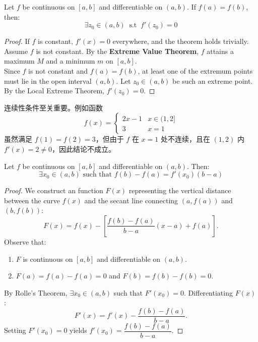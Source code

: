 \documentclass[
	UTF-8,
	11pt, %
	a4paper, %
]{LegrandOrangeBook}
\begin{document}
    \begin{lemma}
    Let $f$ be continuous on $[a, b]$ and differentiable on $(a, b)$. If $f(a) = f(b)$, then:
    \[ \exists z_0 \in (a, b)\ \text{ s.t }\ f'(z_0) = 0 \]
    \end{lemma}

    \begin{proof}
    If $f$ is constant, $f'(x) = 0$ everywhere, and the theorem holds trivially.\\

    Assume $f$ is not constant. By the \textbf{Extreme Value Theorem}, 
    $f$ attains a maximum $M$ and a minimum $m$ on $[a, b]$.\\

    Since $f$ is not constant and $f(a) = f(b)$, 
    at least one of the extremum points must lie in the open interval $(a, b)$.
    Let $z_0 \in (a, b)$ be such an extreme point. By the Local Extreme Theorem, $f'(z_0) = 0$.
    \end{proof}

    \begin{remark}
        连续性条件至关重要。例如函数
        \[ f(x) = \begin{cases} 2x - 1 & x \in (1, 2] \\ 3 & x = 1 \end{cases} \]
        虽然满足 $f(1)=f(2)=3$，但由于 $f$ 在 $x=1$ 处不连续，且在 $(1,2)$ 内 $f'(x)=2 \neq 0$，因此结论不成立。
    \end{remark}

    \begin{theorem}
    Let $f$ be continuous on $[a, b]$ and differentiable on $(a, b)$. Then:
    \[ \exists x_0 \in (a, b) \text{ such that } f(b) - f(a) = f'(x_0)(b - a) \]
    \end{theorem}

    \begin{proof}
    We construct an function $F(x)$ representing the vertical distance between the curve $f(x)$ and the secant line connecting $(a, f(a))$ and $(b, f(b))$:
    \[ F(x) = f(x) - \left[ \frac{f(b) - f(a)}{b - a}(x - a) + f(a) \right]. \]
    Observe that:
    \begin{enumerate}
        \item $F$ is continuous on $[a, b]$ and differentiable on $(a, b)$.
        \item $F(a) = f(a) - f(a) = 0$ and $F(b) = f(b) - f(b) = 0$.
    \end{enumerate}
    By Rolle's Theorem, $\exists x_0 \in (a, b)$ such that $F'(x_0) = 0$.
    Differentiating $F(x)$:
    \[ F'(x) = f'(x) - \frac{f(b) - f(a)}{b - a}. \]
    Setting $F'(x_0) = 0$ yields $f'(x_0) = \dfrac{f(b) - f(a)}{b - a}$.
    \end{proof}
\end{document}
